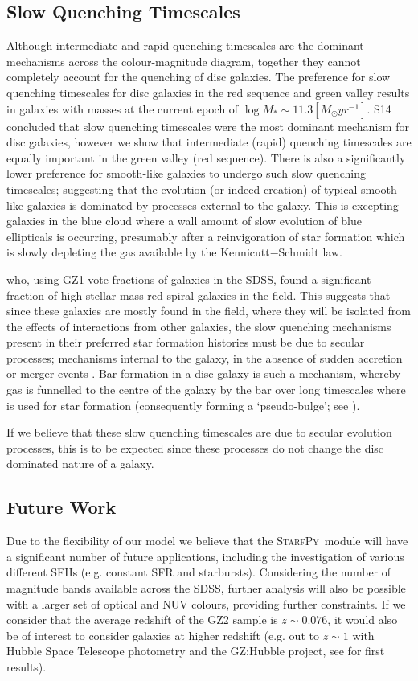 \documentclass[useAMS,usenatbib]{mn2e}
\def\changed    {\color{titlecol} }
\def\starfpy {\textsc{StarfPy}}
\begin{document}
\subsection{Slow Quenching Timescales}\label{slow}
Although intermediate and rapid quenching timescales are the dominant mechanisms across the colour-magnitude diagram, together they cannot completely account for the quenching of disc galaxies. The preference for slow quenching timescales for disc galaxies in the red sequence and green valley  results in galaxies with masses at the current epoch of $\log M_* \sim 11.3 [M_{\odot} yr^{-1}] $. S14 concluded that slow quenching timescales were the most dominant mechanism for disc galaxies, {\changed however we show that intermediate (rapid) quenching timescales are equally important in the green valley (red sequence).} There is also a significantly lower preference for smooth-like galaxies to undergo such slow quenching timescales; suggesting that the evolution (or indeed creation) of typical smooth-like galaxies is dominated by processes external to the galaxy. {\changed This is excepting galaxies in the blue cloud where a wall amount of slow evolution of blue ellipticals is occurring, presumably after a reinvigoration of star formation which is slowly depleting the gas available by the Kennicutt$-$Schmidt law.}

\citet{Bamford09} who, using GZ1 vote fractions of galaxies in the SDSS, found a significant fraction of high stellar mass red spiral galaxies in the field. This suggests that since these galaxies are mostly found in the field, where they will be isolated from the effects of interactions from other galaxies, the slow quenching mechanisms present in their preferred star formation histories must be due to secular processes; mechanisms internal to the galaxy, in the absence of sudden accretion or merger events \citep{KK04, Sheth12}. Bar formation in a disc galaxy is such a mechanism, whereby gas is funnelled to the centre of the galaxy by the bar over long timescales where is used for star formation (consequently forming a `pseudo-bulge'; see \citealt{Kormendy10, Simmons13}).

 If we believe that these slow quenching timescales are due to secular evolution processes, this is to be expected since these processes do not change the disc dominated nature of a galaxy. 

\subsection{Future Work}\label{future}
Due to the flexibility of our model we believe that the \starfpy ~module will have a significant number of future applications, including the investigation of various different SFHs (e.g. constant SFR and starbursts). Considering the number of magnitude bands available across the SDSS, further analysis will also be possible with a larger set of optical and NUV colours, providing further constraints. If we consider that the average redshift of the GZ2 sample is $z \sim 0.076$, it would also be of interest to consider galaxies at higher redshift {\changed (e.g. out to $z \sim 1$ with Hubble Space Telescope photometry and the GZ:Hubble project, see \citealt{Melvin14} for first results). }
\end{document}
